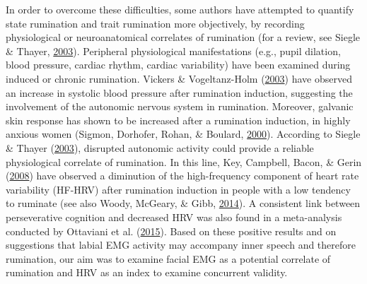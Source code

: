 \documentclass[a4paper,12pt,twoside,openright,oldfontcommands]{memoir}
\begin{document}
In order to overcome these difficulties, some authors have attempted to quantify state rumination and trait rumination more objectively, by recording physiological or neuroanatomical correlates of rumination (for a review, see Siegle \& Thayer, \protect\hyperlink{ref-papageorgiou_physiological_2003}{2003}). Peripheral physiological manifestations (e.g., pupil dilation, blood pressure, cardiac rhythm, cardiac variability) have been examined during induced or chronic rumination. Vickers \& Vogeltanz-Holm (\protect\hyperlink{ref-vickers_effects_2003}{2003}) have observed an increase in systolic blood pressure after rumination induction, suggesting the involvement of the autonomic nervous system in rumination. Moreover, galvanic skin response has shown to be increased after a rumination induction, in highly anxious women (Sigmon, Dorhofer, Rohan, \& Boulard, \protect\hyperlink{ref-sigmon_impact_2000}{2000}). According to Siegle \& Thayer (\protect\hyperlink{ref-papageorgiou_physiological_2003}{2003}), disrupted autonomic activity could provide a reliable physiological correlate of rumination. In this line, Key, Campbell, Bacon, \& Gerin (\protect\hyperlink{ref-Key2008}{2008}) have observed a diminution of the high-frequency component of heart rate variability (HF-HRV) after rumination induction in people with a low tendency to ruminate (see also Woody, McGeary, \& Gibb, \protect\hyperlink{ref-woody_brooding_2014}{2014}). A consistent link between perseverative cognition and decreased HRV was also found in a meta-analysis conducted by Ottaviani et al. (\protect\hyperlink{ref-Ottaviani2015}{2015}). Based on these positive results and on suggestions that labial EMG activity may accompany inner speech and therefore rumination, our aim was to examine facial EMG as a potential correlate of rumination and HRV as an index to examine concurrent validity.
\end{document}
